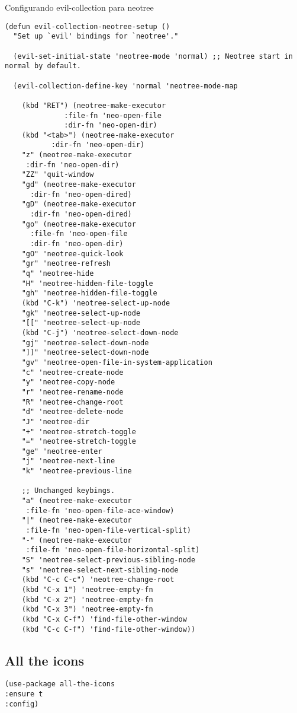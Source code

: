 \documentclass[11pt]{article}
\begin{document}
Configurando evil-collection para neotree
\begin{verbatim}
(defun evil-collection-neotree-setup ()
  "Set up `evil' bindings for `neotree'."

  (evil-set-initial-state 'neotree-mode 'normal) ;; Neotree start in normal by default.

  (evil-collection-define-key 'normal 'neotree-mode-map

    (kbd "RET") (neotree-make-executor
		      :file-fn 'neo-open-file
		      :dir-fn 'neo-open-dir)
    (kbd "<tab>") (neotree-make-executor
		   :dir-fn 'neo-open-dir)
    "z" (neotree-make-executor
	 :dir-fn 'neo-open-dir)
    "ZZ" 'quit-window
    "gd" (neotree-make-executor
	  :dir-fn 'neo-open-dired)
    "gD" (neotree-make-executor
	  :dir-fn 'neo-open-dired)
    "go" (neotree-make-executor
	  :file-fn 'neo-open-file
	  :dir-fn 'neo-open-dir)
    "gO" 'neotree-quick-look
    "gr" 'neotree-refresh
    "q" 'neotree-hide
    "H" 'neotree-hidden-file-toggle
    "gh" 'neotree-hidden-file-toggle
    (kbd "C-k") 'neotree-select-up-node
    "gk" 'neotree-select-up-node
    "[[" 'neotree-select-up-node
    (kbd "C-j") 'neotree-select-down-node
    "gj" 'neotree-select-down-node
    "]]" 'neotree-select-down-node
    "gv" 'neotree-open-file-in-system-application
    "c" 'neotree-create-node
    "y" 'neotree-copy-node
    "r" 'neotree-rename-node
    "R" 'neotree-change-root
    "d" 'neotree-delete-node
    "J" 'neotree-dir
    "+" 'neotree-stretch-toggle
    "=" 'neotree-stretch-toggle
    "ge" 'neotree-enter
    "j" 'neotree-next-line
    "k" 'neotree-previous-line

    ;; Unchanged keybings.
    "a" (neotree-make-executor
	 :file-fn 'neo-open-file-ace-window)
    "|" (neotree-make-executor
	 :file-fn 'neo-open-file-vertical-split)
    "-" (neotree-make-executor
	 :file-fn 'neo-open-file-horizontal-split)
    "S" 'neotree-select-previous-sibling-node
    "s" 'neotree-select-next-sibling-node
    (kbd "C-c C-c") 'neotree-change-root
    (kbd "C-x 1") 'neotree-empty-fn
    (kbd "C-x 2") 'neotree-empty-fn
    (kbd "C-x 3") 'neotree-empty-fn
    (kbd "C-x C-f") 'find-file-other-window
    (kbd "C-c C-f") 'find-file-other-window))
\end{verbatim}

\subsection{All the icons}
\label{sec:org24d60e5}
\begin{verbatim}
(use-package all-the-icons
:ensure t
:config)
\end{verbatim}
\end{document}

